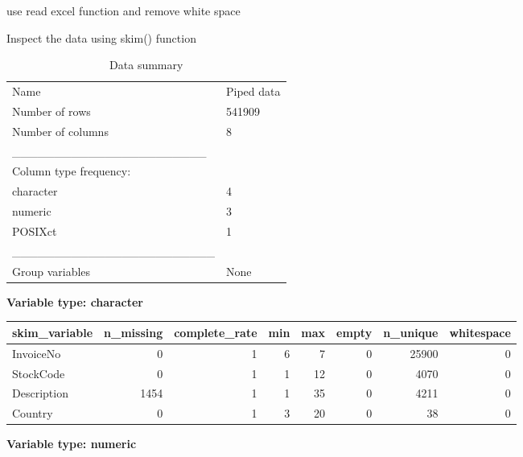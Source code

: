 \documentclass[
]{article}
\begin{document}
use read excel function and remove white space

Inspect the data using skim() function

\begin{longtable}[]{@{}ll@{}}
\caption{Data summary}\tabularnewline
\toprule
\endhead
Name & Piped data\tabularnewline
Number of rows & 541909\tabularnewline
Number of columns & 8\tabularnewline
\_\_\_\_\_\_\_\_\_\_\_\_\_\_\_\_\_\_\_\_\_\_\_ &\tabularnewline
Column type frequency: &\tabularnewline
character & 4\tabularnewline
numeric & 3\tabularnewline
POSIXct & 1\tabularnewline
\_\_\_\_\_\_\_\_\_\_\_\_\_\_\_\_\_\_\_\_\_\_\_\_ &\tabularnewline
Group variables & None\tabularnewline
\bottomrule
\end{longtable}

\textbf{Variable type: character}

\begin{longtable}[]{@{}lrrrrrrr@{}}
\toprule
skim\_variable & n\_missing & complete\_rate & min & max & empty &
n\_unique & whitespace\tabularnewline
\midrule
\endhead
InvoiceNo & 0 & 1 & 6 & 7 & 0 & 25900 & 0\tabularnewline
StockCode & 0 & 1 & 1 & 12 & 0 & 4070 & 0\tabularnewline
Description & 1454 & 1 & 1 & 35 & 0 & 4211 & 0\tabularnewline
Country & 0 & 1 & 3 & 20 & 0 & 38 & 0\tabularnewline
\bottomrule
\end{longtable}

\textbf{Variable type: numeric}
\end{document}
